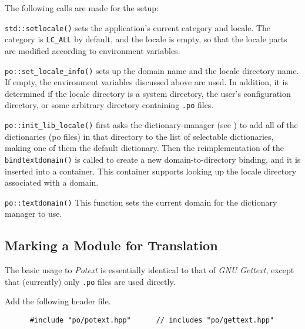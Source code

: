    The following calls are made for the setup:

   \begin{enumber}
      \item \texttt{std::setlocale()} sets the application's current
         category and locale.
         The category is \texttt{LC\_ALL} by default, and the locale
         is empty, so that the locale parts are modified according to
         environment variables.
      \item \texttt{po::set\_locale\_info()} sets up the domain name
         and the locale directory name. If empty, the
         environment variables discussed above are used.
         In addition, it is determined if the locale directory
         is a system directory, the user's configuration directory,
         or some arbitrary directory containing \texttt{.po} files.
      \item \texttt{po::init\_lib\_locale()} first
         asks the dictionary-manager (see 
         )
         to add all of the dictionaries (po files) in that directory
         to the list of selectable dictionaries, making one
         of them the default dictionary.
         Then the reimplementation of the \texttt{bindtextdomain()}
         is called to create a new domain-to-directory binding, and
         it is inserted into a container.
         This container supports looking up the locale directory
         associated with a domain.
      \item \texttt{po::textdomain()}
         This function sets the current domain for the dictionary
         manager to use.
   \end{enumber}

\subsection{Marking a Module for Translation}
\label{subsubsec:potext_usage_marking}

   The basic usage to \textsl{Potext} is essentially identical to
   that of \textsl{GNU Gettext}, except that (currently) only
   \texttt{.po} files are used directly.

   Add the following header file.

   \begin{verbatim}
      #include "po/potext.hpp"      // includes "po/gettext.hpp"
   \end{verbatim}

